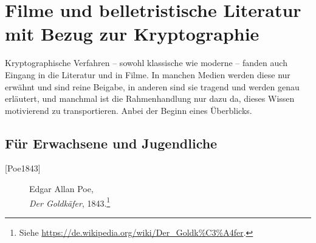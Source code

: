 %


\begin{refsegment}

\newpage
\hypertarget{appendix-movies}{}
\section{Filme und belletristische Literatur mit Bezug zur Kryptographie}
\label{s:appendix-movies}


Kryptographische Verfahren -- sowohl klassische wie moderne -- fanden auch
Eingang in die Literatur und in Filme. In manchen Medien werden diese nur
erwähnt und sind reine Beigabe, in anderen sind sie tragend und werden
genau erläutert, und manchmal ist die Rahmenhandlung nur dazu da, dieses
Wissen motivierend zu transportieren. Anbei der Beginn eines Überblicks.

\subsection{Für Erwachsene und Jugendliche}
\label{s:Light-fiction-for-grownups}



\begin{description}

\item[\textrm{[Poe1843]}] 
    Edgar Allan Poe, \\
    {\em Der Goldkäfer}, 1843.\footnote{%
        Siehe \url{https://de.wikipedia.org/wiki/Der_Goldk%C3%A4fer}.

}
\end{description}
\end{refsegment}

